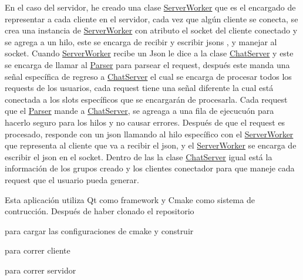 En el caso del servidor, he creado una clase \mbox{\hyperlink{class_server_worker}{Server\+Worker}} que es el encargado de representar a cada cliente en el servidor, cada vez que algún cliente se conecta, se crea una instancia de \mbox{\hyperlink{class_server_worker}{Server\+Worker}} con atributo el socket del cliente conectado y se agrega a un hilo, este se encarga de recibir y escribir jsons , y manejar al socket. Cuando \mbox{\hyperlink{class_server_worker}{Server\+Worker}} recibe un Json le dice a la clase \mbox{\hyperlink{class_chat_server}{Chat\+Server}} y este se encarga de llamar al \mbox{\hyperlink{class_parser}{Parser}} para parsear el request, después este manda una señal específica de regreso a \mbox{\hyperlink{class_chat_server}{Chat\+Server}} el cual se encarga de procesar todos los requests de los usuarios, cada request tiene una señal diferente la cual está conectada a los slots específicos que se encargarán de procesarla. Cada request que el \mbox{\hyperlink{class_parser}{Parser}} mande a \mbox{\hyperlink{class_chat_server}{Chat\+Server}}, se agreaga a una fila de ejecucuón para hacerlo seguro para los hilos y no causar errores. Después de que el request es procesado, responde con un json llamando al hilo específico con el \mbox{\hyperlink{class_server_worker}{Server\+Worker}} que representa al cliente que va a recibir el json, y el \mbox{\hyperlink{class_server_worker}{Server\+Worker}} se encarga de escribir el json en el socket. Dentro de las la clase \mbox{\hyperlink{class_chat_server}{Chat\+Server}} igual está la información de los grupos creado y los clientes conectador para que maneje cada request que el usuario pueda generar.


Esta aplicación utiliza Qt como framework y Cmake como sistema de contrucción. Después de haber clonado el repositorio 
\begin{DoxyCode}{0}

\end{DoxyCode}
 para cargar las configuraciones de cmake y construir 
\begin{DoxyCode}{0}

\end{DoxyCode}
 para correr cliente 
\begin{DoxyCode}{0}

\end{DoxyCode}
 para correr servidor 
\begin{DoxyCode}{0}

\end{DoxyCode}

